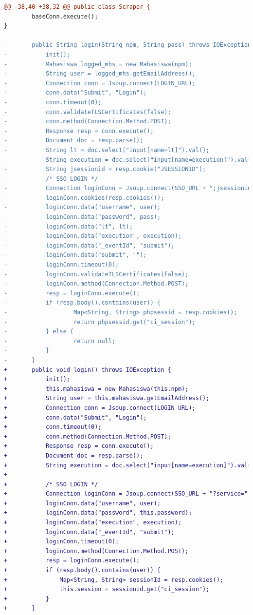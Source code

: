 \begin{lstlisting}[language=diff, caption=Perubahan Implementasi Jsoup Login, label=diff_login]
@@ -38,40 +38,32 @@ public class Scraper {
        baseConn.execute();
}

-       public String login(String npm, String pass) throws IOException {
-           init();
-           Mahasiswa logged_mhs = new Mahasiswa(npm);
-           String user = logged_mhs.getEmailAddress();
-           Connection conn = Jsoup.connect(LOGIN_URL);
-           conn.data("Submit", "Login");
-           conn.timeout(0);
-           conn.validateTLSCertificates(false);
-           conn.method(Connection.Method.POST);
-           Response resp = conn.execute();
-           Document doc = resp.parse();
-           String lt = doc.select("input[name=lt]").val();
-           String execution = doc.select("input[name=execution]").val();
-           String jsessionid = resp.cookie("JSESSIONID");
-           /* SSO LOGIN */
-           Connection loginConn = Jsoup.connect(SSO_URL + ";jsessionid=" + jsessionid + "?service=" + LOGIN_URL);
-           loginConn.cookies(resp.cookies());
-           loginConn.data("username", user);
-           loginConn.data("password", pass);
-           loginConn.data("lt", lt);
-           loginConn.data("execution", execution);
-           loginConn.data("_eventId", "submit");
-           loginConn.data("submit", "");
-           loginConn.timeout(0);
-           loginConn.validateTLSCertificates(false);
-           loginConn.method(Connection.Method.POST);
-           resp = loginConn.execute();
-           if (resp.body().contains(user)) {
-                   Map<String, String> phpsessid = resp.cookies();
-                   return phpsessid.get("ci_session");
-           } else {
-                   return null;
-           }
-       }
+       public void login() throws IOException {
+           init();
+           this.mahasiswa = new Mahasiswa(this.npm);
+           String user = this.mahasiswa.getEmailAddress();
+           Connection conn = Jsoup.connect(LOGIN_URL);
+           conn.data("Submit", "Login");
+           conn.timeout(0);
+           conn.method(Connection.Method.POST);
+           Response resp = conn.execute();
+           Document doc = resp.parse();
+           String execution = doc.select("input[name=execution]").val();
+
+           /* SSO LOGIN */
+           Connection loginConn = Jsoup.connect(SSO_URL + "?service=" + LOGIN_URL);
+           loginConn.data("username", user);
+           loginConn.data("password", this.password);
+           loginConn.data("execution", execution);
+           loginConn.data("_eventId", "submit");
+           loginConn.timeout(0);
+           loginConn.method(Connection.Method.POST);
+           resp = loginConn.execute();
+           if (resp.body().contains(user)) {
+               Map<String, String> sessionId = resp.cookies();
+               this.session = sessionId.get("ci_session");
+           }
+       }
\end{lstlisting}

